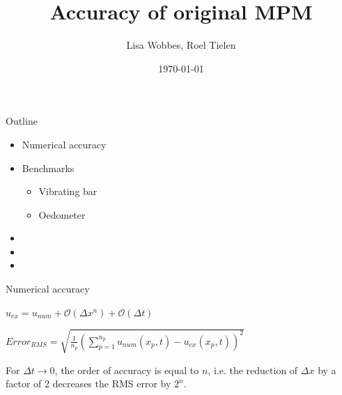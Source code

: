\documentclass[mathserif,professionalfont]{beamer}
\title[Accuracy of original MPM]{Accuracy of original MPM}
\author[]{Lisa Wobbes, Roel Tielen}
\date[\today]{\today}
\begin{document}
{
\frame{\titlepage}
}

\begin{frame}{Outline}
\begin{itemize}
\item Numerical accuracy
\item Benchmarks
	\begin{itemize}
	\item Vibrating bar 
	\item Oedometer
	\end{itemize}
\item
\item
\item
\end{itemize}
\end{frame}

\begin{frame}{Numerical accuracy}
\begin{tcolorbox}[colback=red!5,colframe=red!50!black,title=Numerical Approximation]
$u_{ex} = u_{num} + \mathcal{O}(\Delta x^n) + \mathcal{O}(\Delta t)$ %
\end{tcolorbox}
\begin{tcolorbox}[colback=red!5,colframe=red!50!black,title=RMS Error]
$Error_{RMS} = \sqrt{\frac{1}{n_p} \left(\sum_{p=1}^{n_p}u_{num}(x_p,t) - u_{ex}(x_p,t)\right)^2}$
\end{tcolorbox}
\begin{tcolorbox}[colback=blue!5,colframe=blue!40!black,title=Accuracy in displacement]
For $\Delta t \to 0$, the order of accuracy is equal to $n$, i.e. the reduction of $\Delta x$ by a factor of 2 decreases the RMS error by $2^n$.
\end{tcolorbox}
\end{frame}
\end{document}

